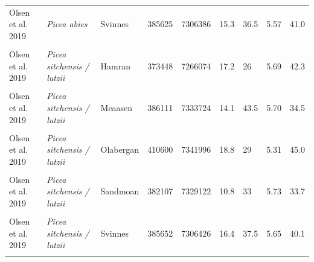 \documentclass[
]{article}
\begin{document}
\begin{landscape}
\begin{longtable}[t]{l>{}llllllll}
Olsen et al. 2019 & \em{Picea abies} & Svinnes & 385625 & 7306386 & 15.3 & 36.5 & 5.57 & 41.0\\
\cellcolor{gray!6}{Olsen et al. 2019} & \em{\cellcolor{gray!6}{Picea sitchensis / lutzii}} & \cellcolor{gray!6}{Alstahaugmyran} & \cellcolor{gray!6}{382564} & \cellcolor{gray!6}{7311547} & \cellcolor{gray!6}{15.7} & \cellcolor{gray!6}{31.5} & \cellcolor{gray!6}{5.49} & \cellcolor{gray!6}{45.7}\\
Olsen et al. 2019 & \em{Picea sitchensis / lutzii} & Hamran & 373448 & 7266074 & 17.2 & 26 & 5.69 & 42.3\\
\cellcolor{gray!6}{Olsen et al. 2019} & \em{\cellcolor{gray!6}{Picea sitchensis / lutzii}} & \cellcolor{gray!6}{Langvassfjellet} & \cellcolor{gray!6}{409484} & \cellcolor{gray!6}{7330371} & \cellcolor{gray!6}{17.6} & \cellcolor{gray!6}{36.5} & \cellcolor{gray!6}{4.87} & \cellcolor{gray!6}{54.0}\\
\addlinespace
Olsen et al. 2019 & \em{Picea sitchensis / lutzii} & Meaasen & 386111 & 7333724 & 14.1 & 43.5 & 5.70 & 34.5\\
\cellcolor{gray!6}{Olsen et al. 2019} & \em{\cellcolor{gray!6}{Picea sitchensis / lutzii}} & \cellcolor{gray!6}{Myrmo} & \cellcolor{gray!6}{391075} & \cellcolor{gray!6}{7321058} & \cellcolor{gray!6}{18.8} & \cellcolor{gray!6}{37} & \cellcolor{gray!6}{5.22} & \cellcolor{gray!6}{37.4}\\
Olsen et al. 2019 & \em{Picea sitchensis / lutzii} & Olabergan & 410600 & 7341996 & 18.8 & 29 & 5.31 & 45.0\\
\cellcolor{gray!6}{Olsen et al. 2019} & \em{\cellcolor{gray!6}{Picea sitchensis / lutzii}} & \cellcolor{gray!6}{Plogskjaeret} & \cellcolor{gray!6}{378814} & \cellcolor{gray!6}{7280849} & \cellcolor{gray!6}{16.1} & \cellcolor{gray!6}{26} & \cellcolor{gray!6}{5.57} & \cellcolor{gray!6}{43.5}\\
Olsen et al. 2019 & \em{Picea sitchensis / lutzii} & Sandmoan & 382107 & 7329122 & 10.8 & 33 & 5.73 & 33.7\\
\addlinespace
\cellcolor{gray!6}{Olsen et al. 2019} & \em{\cellcolor{gray!6}{Picea sitchensis / lutzii}} & \cellcolor{gray!6}{Steinaasen} & \cellcolor{gray!6}{375834} & \cellcolor{gray!6}{7274496} & \cellcolor{gray!6}{17.9} & \cellcolor{gray!6}{35} & \cellcolor{gray!6}{5.50} & \cellcolor{gray!6}{37.6}\\
Olsen et al. 2019 & \em{Picea sitchensis / lutzii} & Svinnes & 385652 & 7306426 & 16.4 & 37.5 & 5.65 & 40.1\\
\cellcolor{gray!6}{Olsen et al. 2019} & \em{\cellcolor{gray!6}{Picea sitchensis / lutzii}} & \cellcolor{gray!6}{Valan} & \cellcolor{gray!6}{383545} & \cellcolor{gray!6}{7304119} & \cellcolor{gray!6}{15.5} & \cellcolor{gray!6}{35} & \cellcolor{gray!6}{5.61} & \cellcolor{gray!6}{41.5}\\

\end{longtable}
\end{landscape}
\end{document}
